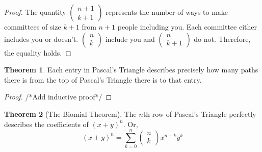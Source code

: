 \documentclass[11pt]{article}
\theoremstyle{definition}
\newtheorem{theorem}{Theorem}[section]
\begin{document}
\begin{proof}
    The quantity $(\begin{smallmatrix} n+1 \\ k+1 \end{smallmatrix})$ represents the number of ways to make committees of size $k+1$ from $n+1$ people including you. Each committee either includes you or doesn't. $(\begin{smallmatrix} n \\ k \end{smallmatrix})$ include you and $(\begin{smallmatrix} n \\ k+1 \end{smallmatrix})$ do not. Therefore, the equality holds.
\end{proof}
\begin{theorem}
Each entry in Pascal's Triangle describes precisely how many paths there is
from the top of Pascal's Triangle there is to that entry.
\end{theorem}
\begin{proof}
/*Add inductive proof*/
\end{proof}
\begin{theorem}[The Biomial Theorem]
    The $n$th row of Pascal's Triangle perfectly describes the coefficients of $(x+y)^n$. Or, 
    \begin{equation*}
        (x+y)^n = \sum_{k=0}^n
        \begin{pmatrix} n \\ k \end{pmatrix}x^{n-k}y^k
    \end{equation*}
\end{theorem}
\end{document}
